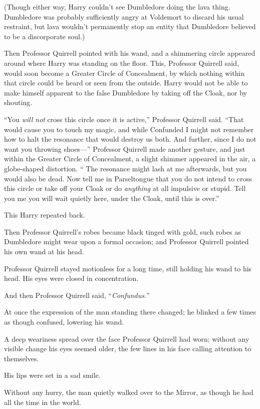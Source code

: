 (Though either way, Harry couldn’t see Dumbledore doing the lava thing. Dumbledore was probably sufficiently angry at Voldemort to discard his usual restraint, but lava wouldn’t permanently stop an entity that Dumbledore believed to be a discorporate soul.)

Then Professor Quirrell pointed with his wand, and a shimmering circle appeared around where Harry was standing on the floor. This, Professor Quirrell said, would soon become a Greater Circle of Concealment, by which nothing within that circle could be heard or seen from the outside. Harry would not be able to make himself apparent to the false Dumbledore by taking off the Cloak, nor by shouting.

“You \emph{will not} cross this circle once it is active,” Professor Quirrell said. “That would cause you to touch my magic, and while Confunded I might not remember how to halt the resonance that would destroy us both. And further, since I do not want you throwing shoes—” Professor Quirrell made another gesture, and just within the Greater Circle of Concealment, a slight shimmer appeared in the air, a globe-shaped distortion. “ The resonance might lash at me afterwards, but you would also be dead. Now tell me in Parseltongue that you do not intend to cross this circle or take off your Cloak or do \emph{anything} at all impulsive or stupid. Tell you me you will wait quietly here, under the Cloak, until this is over.”

This Harry repeated back.

Then Professor Quirrell’s robes became black tinged with gold, such robes as Dumbledore might wear upon a formal occasion; and Professor Quirrell pointed his own wand at his head.

Professor Quirrell stayed motionless for a long time, still holding his wand to his head. His eyes were closed in concentration.

And then Professor Quirrell said, “\emph{Confundus.}”

At once the expression of the man standing there changed; he blinked a few times as though confused, lowering his wand.

A deep weariness spread over the face Professor Quirrell had worn; without any visible change his eyes seemed older, the few lines in his face calling attention to themselves.

His lips were set in a sad smile.

Without any hurry, the man quietly walked over to the Mirror, as though he had all the time in the world.

